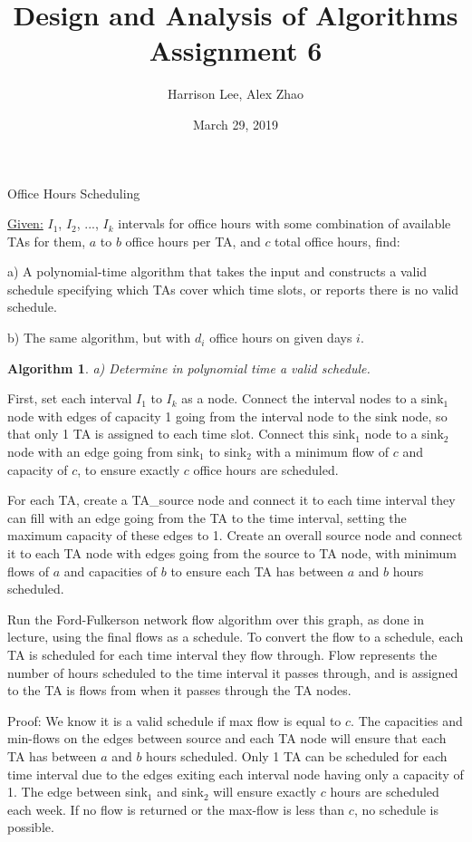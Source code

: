\documentclass[11pt, oneside]{article}
\title {Design and Analysis of Algorithms Assignment 6}
\author{Harrison Lee, Alex Zhao}
\date{March 29, 2019}
\newenvironment{Question}[1]
  {\renewcommand\theinnerQuestion{#1}\innerQuestion}
  {\endinnerQuestion}
\newtheorem{Algorithm}{Algorithm}
\begin{document}
\maketitle

\begin{Question}{7.28} Office Hours Scheduling\par
\end{Question}

\noindent \underline{Given:} $I_1$, $I_2$, ..., $I_k$ intervals for office hours with some combination of available TAs for them, $a$ to $b$ office hours per TA, and $c$ total office hours, find:\par
a) A polynomial-time algorithm that takes the input and constructs a valid schedule specifying which TAs cover which time slots, or reports there is no valid schedule.\par
b) The same algorithm, but with $d_i$ office hours on given days $i$.

\bigskip
\begin{Algorithm} a) Determine in polynomial time a valid schedule. \end{Algorithm}
First, set each interval $I_1$ to $I_k$ as a node. Connect the interval nodes to a sink$_1$ node with edges of capacity 1 going from the interval node to the sink node, so that only 1 TA is assigned to each time slot. Connect this sink$_1$ node to a sink$_2$ node with an edge going from sink$_1$ to sink$_2$ with a minimum flow of $c$ and capacity of $c$, to ensure exactly $c$ office hours are scheduled.

For each TA, create a TA\_source node and connect it to each time interval they can fill with an edge going from the TA to the time interval, setting the maximum capacity of these edges to 1. Create an overall source node and connect it to each TA node with edges going from the source to TA node, with minimum flows of $a$ and capacities of $b$ to ensure each TA has between $a$ and $b$ hours scheduled.

Run the Ford-Fulkerson network flow algorithm over this graph, as done in lecture, using the final flows as a schedule. To convert the flow to a schedule, each TA is scheduled for each time interval they flow through. Flow represents the number of hours scheduled to the time interval it passes through, and is assigned to the TA is flows from when it passes through the TA nodes.

Proof: We know it is a valid schedule if max flow is equal to $c$. The capacities and min-flows on the edges between source and each TA node will ensure that each TA has between $a$ and $b$ hours scheduled. Only 1 TA can be scheduled for each time interval due to the edges exiting each interval node having only a capacity of 1. The edge between sink$_1$ and sink$_2$ will ensure exactly $c$ hours are scheduled each week. If no flow is returned or the max-flow is less than $c$, no schedule is possible.
\end{document}
